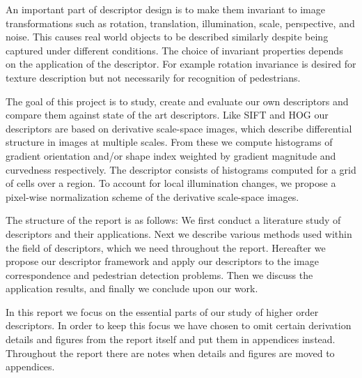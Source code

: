 \documentclass[thesis.tex]{subfiles}
\begin{document}
An important part of descriptor design is to make them invariant to image transformations such as rotation, translation, illumination, scale, perspective, and noise. This causes real world objects to be described similarly despite being captured under different conditions. The choice of invariant properties depends on the application of the descriptor. For example rotation invariance is desired for texture description but not necessarily for recognition of pedestrians.

The goal of this project is to study, create and evaluate our own descriptors and compare them against state of the art descriptors. Like SIFT and HOG our descriptors are based on derivative scale-space images, which describe differential structure in images at multiple scales. From these we compute histograms of gradient orientation and/or shape index weighted by gradient magnitude and curvedness respectively. The descriptor consists of histograms computed for a grid of cells over a region. To account for local illumination changes, we propose a pixel-wise normalization scheme of the derivative scale-space images.

The structure of the report is as follows: We first conduct a literature study of descriptors and their applications. Next we describe various methods used within the field of descriptors, which we need throughout the report. Hereafter we propose our descriptor framework and apply our descriptors to the image correspondence and pedestrian detection problems. Then we discuss the application results, and finally we conclude upon our work.

In this report we focus on the essential parts of our study of higher order descriptors. In order to keep this focus we have chosen to omit certain derivation details and figures from the report itself and put them in appendices instead. Throughout the report there are notes when details and figures are moved to appendices.

\subbibliography
\end{document}
